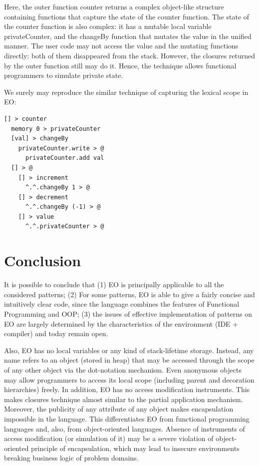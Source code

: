 \documentclass[sigplan,12pt,nonacm=true,review=false]{acmart}
\begin{document}
Here, the outer function counter returns a complex object-like structure containing functions that capture the state of the counter function. The state of the counter function is also complex: it has a mutable local variable privateCounter, and the changeBy function that mutates the value in the unified manner. The user code may not access the value and the mutating functions directly: both of them disappeared from the stack. However, the closures returned by the outer function still may do it. Hence, the technique allows functional programmers to simulate private state. 

We surely may reproduce the similar technique of capturing the lexical scope in EO:
\begin{verbatim}
[] > counter
  memory 0 > privateCounter
  [val] > changeBy
    privateCounter.write > @
      privateCounter.add val
  [] > @
    [] > increment
      ^.^.changeBy 1 > @
    [] > decrement
      ^.^.changeBy (-1) > @
    [] > value
      ^.^.privateCounter > @

\end{verbatim}



\section{Conclusion}
It is possible to conclude that (1) EO is principally applicable to all the considered patterns; (2) For some patterns, EO is able to give a fairly concise and intuitively clear code, since the language combines the features of Functional Programming and OOP; (3) the issues of effective implementation of patterns on EO are largely determined by the characteristics of the environment (IDE + compiler) and today remain open.

Also, EO has no local variables or any kind of stack-lifetime storage. Instead, any name refers to an object (stored in heap) that may be accessed through the scope of any other object via the dot-notation mechanism. Even anonymous objects may allow programmers to access its local scope (including parent and decoration hierarchies) freely. In addition, EO has no access modification instruments. This makes closures technique almost similar to the partial application mechanism. Moreover, the publicity of any attribute of any object makes encapsulation impossible in the language. This differentiates EO from functional programming languages and, also, from object-oriented languages. Absence of instruments of access modification (or simulation of it) may be a severe violation of object-oriented principle of encapsulation, which may lead to insecure environments breaking business logic of problem domains.
\end{document}
